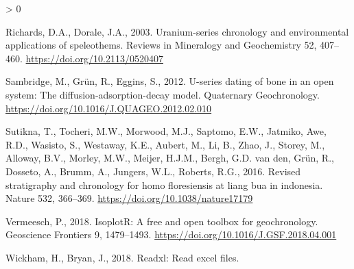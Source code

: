 \documentclass[]{elsarticle} %
\newlength{\cslhangindent}
\newenvironment{CSLReferences}[2] %
 {%
  \setlength{\parindent}{0pt}
  \ifodd #1 \everypar{\setlength{\hangindent}{\cslhangindent}}\ignorespaces\fi
  \ifnum #2 > 0
  \setlength{\parskip}{#2\baselineskip}
  \fi
 }%
 {}
\begin{document}
\begin{CSLReferences}{1}{0}
\leavevmode\hypertarget{ref-RN4494}{}%
Richards, D.A., Dorale, J.A., 2003. Uranium-series chronology and environmental applications of speleothems. Reviews in Mineralogy and Geochemistry 52, 407--460. \url{https://doi.org/10.2113/0520407}

\leavevmode\hypertarget{ref-Sambridge2012}{}%
Sambridge, M., Grün, R., Eggins, S., 2012. U-series dating of bone in an open system: The diffusion-adsorption-decay model. Quaternary Geochronology. \url{https://doi.org/10.1016/J.QUAGEO.2012.02.010}

\leavevmode\hypertarget{ref-Sutikna2016}{}%
Sutikna, T., Tocheri, M.W., Morwood, M.J., Saptomo, E.W., Jatmiko, Awe, R.D., Wasisto, S., Westaway, K.E., Aubert, M., Li, B., Zhao, J., Storey, M., Alloway, B.V., Morley, M.W., Meijer, H.J.M., Bergh, G.D. van den, Grün, R., Dosseto, A., Brumm, A., Jungers, W.L., Roberts, R.G., 2016. Revised stratigraphy and chronology for homo floresiensis at liang bua in indonesia. Nature 532, 366--369. \url{https://doi.org/10.1038/nature17179}

\leavevmode\hypertarget{ref-vermeesch2018isoplotr}{}%
Vermeesch, P., 2018. IsoplotR: A free and open toolbox for geochronology. Geoscience Frontiers 9, 1479--1493. \url{https://doi.org/10.1016/J.GSF.2018.04.001}

\leavevmode\hypertarget{ref-Wickham_readxl}{}%
Wickham, H., Bryan, J., 2018. Readxl: Read excel files.

\end{CSLReferences}
\end{document}
